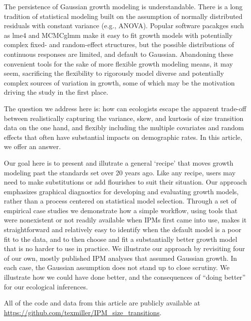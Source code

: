 \documentclass[11pt]{article}
\begin{document}
{The persistence of Gaussian growth modeling is understandable. 
There is a long tradition of statistical modeling built on the assumption of normally distributed residuals with constant variance (e.g., ANOVA).
Popular software pacakges such as lme4 \citep{bates2007lme4} and MCMCglmm \citep{hadfield2010mcmc} make it easy to fit growth models with potentially complex fixed- and random-effect structures, but the possible distributions of continuous responses are limited, and default to Gaussian.
Abandoning these convenient tools for the sake of more flexible growth modeling means, it may seem, sacrificing the flexibility to rigorously model diverse and potentially complex sources of variation in growth, some of which may be the motivation driving the study in the first place.

The question we address here is: how can ecologists escape the apparent trade-off between realistically capturing the 
variance, skew, and kurtosis of size transition data on the one hand, and flexibly including the multiple covariates and random effects 
that often have substantial impacts on demographic rates.  
In this article, we offer an answer. 

Our goal here is to present and illutrate a general `recipe' that moves growth modeling past the standards set over 20 years ago.
Like any recipe, users may need to make substitutions or add flourishes to suit their situation. 
Our approach emphasizes graphical diagnostics for developing and evaluating growth models, rather than a process 
centered on statistical model selection. 
Through a set of empirical case studies we demonstrate how a simple workflow, using tools 
that were nonexistent or not readily available when IPMs first came into use, makes it straightforward and relatively 
easy to identify when the default model is a poor fit to the data, and to then choose and fit a substantially 
better growth model that is no harder to use in practice. 
We illustrate our approach by revisiting four of our own, mostly published IPM analyses that assumed Gaussian growth. 
In each case, the Gaussian assumption does not stand up to close scrutiny. 
We illustrate how we could have done better, and the consequences of ``doing better'' 
for our ecological inferences. 

All of the code and data from this article are publicly available at \url{https://github.com/texmiller/IPM_size_transitions}.

}
\end{document}
